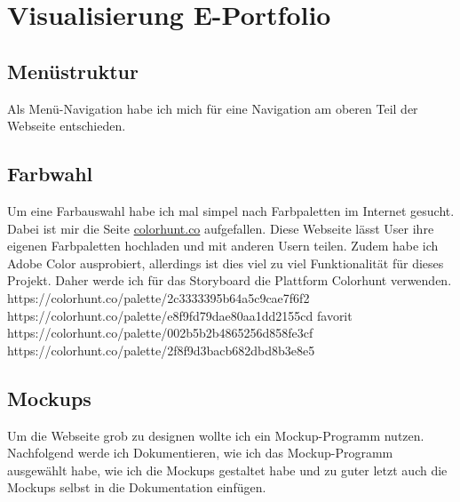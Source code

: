 \documentclass[11pt]{article}
\begin{document}


    \section{Visualisierung E-Portfolio}


    \subsection{Menüstruktur}
    Als Menü-Navigation habe ich mich für eine Navigation am oberen Teil der Webseite entschieden.


    \subsection{Farbwahl}
    Um eine Farbauswahl habe ich mal simpel nach Farbpaletten im Internet gesucht. Dabei ist mir die Seite
    \url{colorhunt.co} aufgefallen. Diese Webseite lässt User ihre eigenen Farbpaletten hochladen und mit
    anderen Usern teilen. Zudem habe ich Adobe Color ausprobiert, allerdings ist dies viel zu viel
    Funktionalität für dieses Projekt. Daher werde ich für das Storyboard die Plattform Colorhunt verwenden.\\
    https://colorhunt.co/palette/2c3333395b64a5c9cae7f6f2\\
    https://colorhunt.co/palette/e8f9fd79dae80aa1dd2155cd \textleftarrow favorit\\
    https://colorhunt.co/palette/002b5b2b4865256d858fe3cf\\
    https://colorhunt.co/palette/2f8f9d3bacb682dbd8b3e8e5\\

    \pagebreak %


    \subsection{Mockups}
    Um die Webseite grob zu designen wollte ich ein Mockup-Programm nutzen. Nachfolgend werde ich Dokumentieren,
    wie ich das Mockup-Programm ausgewählt habe, wie ich die Mockups gestaltet habe und zu guter letzt auch
    die Mockups selbst in die Dokumentation einfügen.

\end{document}
